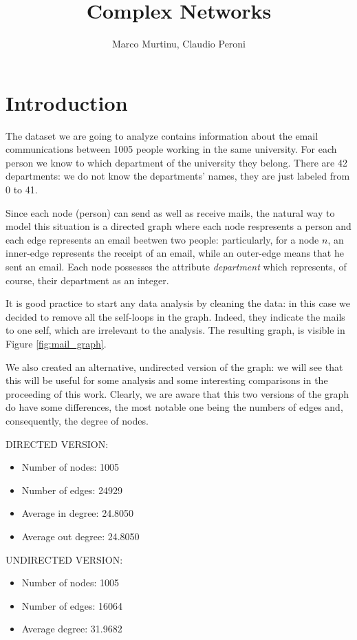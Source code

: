 \documentclass{report}
\title{Complex Networks}
\author{{Marco Murtinu, Claudio Peroni}}
\theoremstyle{definition}
\theoremstyle{remark}
\begin{document}
	\maketitle
\section*{Introduction}	
The dataset we are going to analyze contains information about the email communications between 1005 people working in the same university. For each person we know to which department of the university they belong. There are 42 departments: we do not know the departments' names, they are just labeled from 0 to 41.

Since each node (person) can send as well as receive mails, the natural way to model this situation is a directed graph where each node respresents a person and each edge represents an email beetwen two people: particularly, for a node $n$, an inner-edge represents the receipt of an email, while an outer-edge means that he sent an email. Each node possesses the attribute \textit{department} which represents, of course, their department as an integer.

It is good practice to start any data analysis by cleaning the data: in this case we decided to remove all the self-loops in the graph. Indeed, they indicate the mails to one self, which are irrelevant to the analysis. The resulting graph, is visible in Figure \ref{fig:mail_graph}.

We also created an alternative, undirected version of the graph: we will see that this will be useful for some analysis and some interesting comparisons in the proceeding of this work. Clearly, we are aware that this two versions of the graph do have some differences, the most notable one being the numbers of edges and, consequently, the degree of nodes.
\bigskip

DIRECTED VERSION:

\begin{itemize}
\item Number of nodes: 1005
\item Number of edges: 24929
\item Average in degree: 24.8050
\item Average out degree: 24.8050
\end{itemize}


UNDIRECTED VERSION:

\begin{itemize}
	\item Number of nodes: 1005
	\item Number of edges: 16064
	\item Average degree: 31.9682
\end{itemize}
\end{document}
